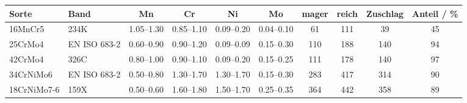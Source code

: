 \begin{tabular}{@{}llccccS[table-format=3.0]S[table-format=3.0]S[table-format=3.0]S[table-format=3.0]@{}}
\toprule
Sorte & Band & Mn & Cr & Ni & Mo & {mager} & {reich} & {Zuschlag} & {Anteil / \%} \\
\midrule
16MnCr5 & 234K & \numrange[range-phrase=--]{1.05}{1.30} & \numrange[range-phrase=--]{0.85}{1.10} & \numrange[range-phrase=--]{0.09}{0.20} & \numrange[range-phrase=--]{0.04}{0.10} & 61 & 111 & 39 & 45 \\
25CrMo4 & EN ISO 683-2 & \numrange[range-phrase=--]{0.60}{0.90} & \numrange[range-phrase=--]{0.90}{1.20} & \numrange[range-phrase=--]{0.09}{0.09} & \numrange[range-phrase=--]{0.15}{0.30} & 110 & 188 & 140 & 94 \\
42CrMo4 & 326C & \numrange[range-phrase=--]{0.80}{1.00} & \numrange[range-phrase=--]{0.90}{1.10} & \numrange[range-phrase=--]{0.09}{0.20} & \numrange[range-phrase=--]{0.15}{0.25} & 111 & 178 & 140 & 97 \\
34CrNiMo6 & EN ISO 683-2 & \numrange[range-phrase=--]{0.50}{0.80} & \numrange[range-phrase=--]{1.30}{1.70} & \numrange[range-phrase=--]{1.30}{1.70} & \numrange[range-phrase=--]{0.15}{0.30} & 283 & 417 & 314 & 90 \\
18CrNiMo7-6 & 159X & \numrange[range-phrase=--]{0.50}{0.60} & \numrange[range-phrase=--]{1.60}{1.80} & \numrange[range-phrase=--]{1.50}{1.70} & \numrange[range-phrase=--]{0.25}{0.35} & 364 & 442 & 358 & 89 \\
\bottomrule
\end{tabular}
